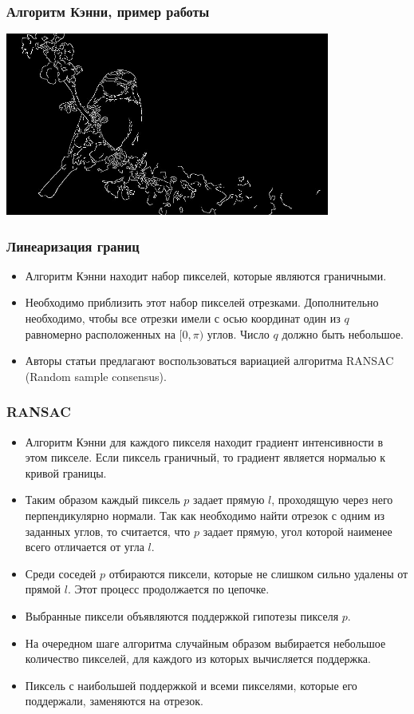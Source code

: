 \begin{frame}\frametitle{Алгоритм Кэнни, пример работы}
    \begin{center}
        \includegraphics[height=6cm]{veselov_imgs/edge_map3.jpg}
    \end{center}
\end{frame}

\begin{frame}\frametitle{Линеаризация границ}
    \begin{itemize}
        \item Алгоритм Кэнни находит набор пикселей, которые являются граничными.
        \pause
        \item Необходимо приблизить этот набор пикселей отрезками. Дополнительно необходимо, чтобы
        все отрезки имели с осью координат один из $q$ равномерно расположенных на $[0, \pi)$ углов.
        Число $q$ должно быть небольшое.
        \pause
        \item Авторы статьи предлагают воспользоваться вариацией алгоритма RANSAC (Random sample consensus).
    \end{itemize}
\end{frame}

\begin{frame}\frametitle{RANSAC}
    \begin{itemize}
        \item Алгоритм Кэнни для каждого пикселя находит градиент интенсивности в этом пикселе.
        Если пиксель граничный, то градиент является нормалью к кривой границы.
        \pause
        \item Таким образом каждый пиксель $p$ задает прямую $l$, проходящую через него перпендикулярно нормали.
        Так как необходимо найти отрезок с одним из заданных углов, то считается, что $p$ задает прямую, угол которой
        наименее всего отличается от угла $l$.
        \pause
        \item Среди соседей $p$ отбираются пиксели, которые не слишком сильно
        удалены от прямой $l$. Этот процесс продолжается по цепочке.
        \pause
        \item Выбранные пиксели объявляются поддержкой гипотезы пикселя $p$.
        \pause
        \item На очередном шаге алгоритма случайным образом выбирается небольшое
        количество пикселей, для каждого из которых вычисляется поддержка.
        \pause
        \item Пиксель с наибольшей поддержкой и всеми пикселями, которые его поддержали, заменяются на отрезок.
    \end{itemize}
\end{frame}

